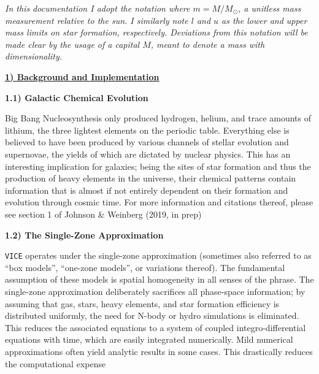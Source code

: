 \documentclass{report}
\begin{document}
\vfill
\begin{center}
\textit{
	In this documentation I adopt the notation where $m = M/M_\odot$, a 
	unitless mass measurement relative to the sun. I similarly note $l$ and 
	$u$ as the lower and upper mass limits on star formation, respectively. 
	Deviations from this notation will be made clear by the usage of a capital 
	$M$, meant to denote a mass with dimensionality.  
}
\end{center}
\clearpage


\newpage
\noindent 
\begin{center}
\hypertarget{sec:background}{
	\underline{\LARGE
		\textbf{1) Background and Implementation}
	}
} 
\end{center}
\par\noindent  
\hypertarget{background:gce}{\textbf{1.1) Galactic Chemical Evolution}} 
\par\noindent 
Big Bang Nucleosynthesis only produced hydrogen, helium, and trace amounts of 
lithium, the three lightest elements on the periodic table. Everything else 
is believed to have been produced by various channels of stellar evolution 
and supernovae, the yields of which are dictated by nuclear physics. This has 
an interesting implication for galaxies; being the sites of star formation 
and thus the production of heavy elements in the universe, their chemical 
patterns contain information that is almost if not entirely dependent on their 
formation and evolution through cosmic time. For more information and 
citations thereof, please see section 1 of Johnson \& Weinberg (2019, in prep)
\par\null\par\noindent 
\hypertarget{background:singlezoneapprox}{\textbf{1.2) The Single-Zone 
Approximation}}
\par\noindent 
\texttt{VICE} operates under the single-zone approximation (sometimes also 
referred to as ``box models'', ``one-zone models'', or variations thereof). 
The fundamental assumption of these models is spatial homogeneity in all 
senses of the phrase. The single-zone approximation deliberately sacrifices 
all phase-space information; by assuming that gas, stars, heavy elements, and 
star formation efficiency is distributed uniformly, the need for N-body or 
hydro simulations is eliminated. This reduces the associated equations to a 
system of coupled integro-differential equations with time, which are easily 
integrated numerically. Mild numerical approximations often yield analytic 
results in some cases. This drastically reduces the computational expense 
\end{document}
